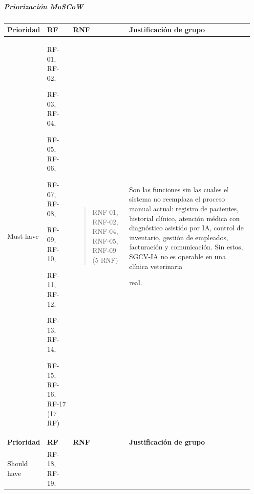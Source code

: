 \documentclass[
]{article}
\newcounter{none} %
\begin{document}
\subparagraph{Priorización MoSCoW}\label{priorizaciuxf3n-moscow}

{\def\LTcaptype{none} %
\begin{longtable}[]{@{}
  >{\centering\arraybackslash}p{}
  >{\raggedright\arraybackslash}p{}
  >{\raggedright\arraybackslash}p{}
  >{\raggedright\arraybackslash}p{}@{}}
\toprule\noalign{}
\begin{minipage}[b]{\linewidth}\centering
\textbf{Prioridad}
\end{minipage} & \begin{minipage}[b]{\linewidth}\centering
\textbf{RF}
\end{minipage} & \begin{minipage}[b]{\linewidth}\centering
\textbf{RNF}
\end{minipage} & \begin{minipage}[b]{\linewidth}\centering
\textbf{Justificación de grupo}
\end{minipage} \\
\midrule\noalign{}
\endhead
\bottomrule\noalign{}
\endlastfoot
Must have & RF-01, RF-02,

RF-03, RF-04,

RF-05, RF-06,

RF-07, RF-08,

RF-09, RF-10,

RF-11, RF-12,

RF-13, RF-14,

RF-15, RF-16, RF-17 (17 RF) &
\begin{minipage}[t]{\linewidth}\raggedright
\begin{quote}
RNF-01, RNF-02, RNF-04, RNF-05, RNF-09 (5 RNF)
\end{quote}
\end{minipage} & Son las funciones sin las cuales el sistema no
reemplaza el proceso manual actual: registro de pacientes, historial
clínico, atención médica con diagnóstico asistido por IA, control de
inventario, gestión de empleados, facturación y comunicación. Sin estos,
SGCV-IA no es operable en una clínica veterinaria

real. \\
\textbf{Prioridad} & \textbf{RF} & \textbf{RNF} & \textbf{Justificación
de grupo} \\
Should have & RF-18, RF-19,


\end{longtable}}
\end{document}
